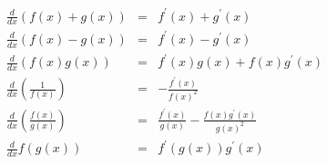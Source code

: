 \documentclass[justified, sixbynine]{tufte-book}
\theoremstyle{plain}%
\newtheorem * {corollary}{Corollary}
\theoremstyle{definition}
\theoremstyle{remark}
\newtheorem * {remark}{Remark}
\newtheorem * {note}{Note}
\begin{document}
\begin{fullwidth}
\begin{eqnarray}
\frac d{dx}\left( f(x)+g(x)\right) &=&f^{\prime }(x)+g^{\prime }(x) \\
\frac d{dx}\left( f(x)-g(x)\right) &=&f^{\prime }(x)-g^{\prime }(x) \\
\frac d{dx}\left( f(x)g(x)\right) &=&f^{\prime }(x)g(x)+f(x)g^{\prime }(x) \\
\frac d{dx}\left( \frac 1{f(x)}\right) &=&-\frac{f^{\prime }(x)}{f(x)^2} \\
\frac d{dx}\left( \frac{f(x)}{g(x)}\right) &=&\frac{f^{\prime }(x)}{g(x)}-%
\frac{f(x)g^{\prime }(x)}{g(x)^2} \\
\frac d{dx}f(g(x)) &=&f^{\prime }(g(x))g^{\prime }(x)
\end{eqnarray}

\end{fullwidth}
\backmatter

\printindex
\end{document}
